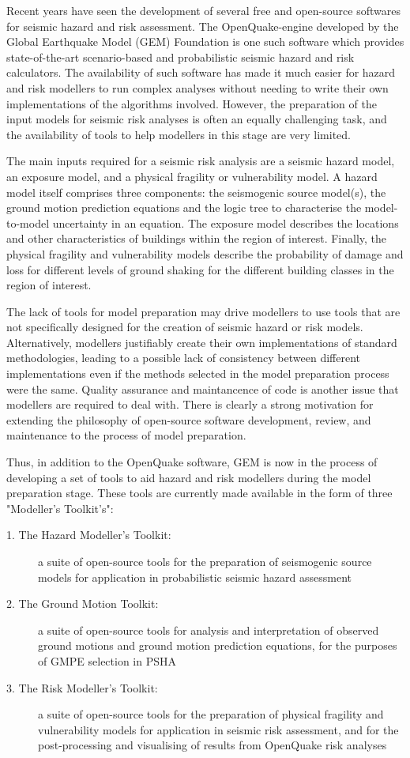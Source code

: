 Recent years have seen the development of several free and open-source softwares for seismic hazard and risk assessment. The OpenQuake-engine developed by the Global Earthquake Model (GEM) Foundation is one such software which provides state-of-the-art scenario-based and probabilistic seismic hazard and risk calculators. The availability of such software has made it much easier for hazard and risk modellers to run complex analyses without needing to write their own implementations of the algorithms involved. However, the preparation of the input models for seismic risk analyses is often an equally challenging task, and the availability of tools to help modellers in this stage are very limited.

The main inputs required for a seismic risk analysis are a seismic hazard model, an exposure model, and a physical fragility or vulnerability model. A hazard model itself comprises three components: the seismogenic source model(s), the ground motion prediction equations and the logic tree to characterise the model-to-model uncertainty in an equation. The exposure model describes the locations and other characteristics of buildings within the region of interest. Finally, the physical fragility and vulnerability models describe the probability of damage and loss for different levels of ground shaking for the different building classes in the region of interest.

The lack of tools for model preparation may drive modellers to use tools that are not specifically designed for the creation of seismic hazard or risk models. Alternatively, modellers justifiably create their own implementations of standard methodologies, leading to a possible lack of consistency between different implementations even if the methods selected in the model preparation process were the same. Quality assurance and maintancence of code is another issue that modellers are required to deal with. There is clearly a strong motivation for extending the philosophy of open-source software development, review, and maintenance to the process of model preparation.

Thus, in addition to the OpenQuake software, GEM is now in the process of developing a set of tools to aid hazard and risk modellers during the model preparation stage. These tools are currently made available in the form of three "Modeller’s Toolkit’s":
\begin{description}
\item[1. The Hazard Modeller’s Toolkit:] a suite of open-source tools for the preparation of seismogenic source models for application in probabilistic seismic hazard assessment \citep{hmtk_guide}
\item[2. The Ground Motion Toolkit:] a suite of open-source tools for analysis and interpretation of observed ground motions and ground motion prediction equations, for the purposes of GMPE selection in PSHA
\item[3. The Risk Modeller's Toolkit:] a suite of open-source tools for the preparation of physical fragility and vulnerability models for application in seismic risk assessment, and for the post-processing and visualising of results from OpenQuake risk analyses
\end{description}

